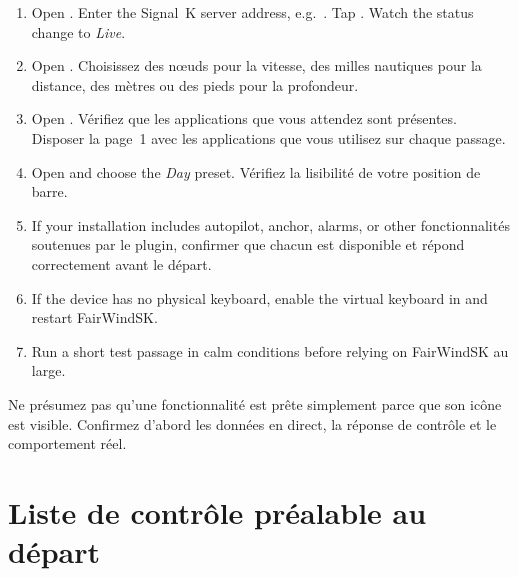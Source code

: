 \begin{enumerate}
  \item Open .
        Enter the Signal~K server address, e.g.\ .
        Tap .
        Watch the status change to \textit{Live}.
  \item Open .
Choisissez des nœuds pour la vitesse, des milles nautiques pour la distance, des mètres ou des pieds pour la profondeur.
  \item Open .
Vérifiez que les applications que vous attendez sont présentes.
Disposer la page~1 avec les applications que vous utilisez sur chaque passage.
  \item Open  and choose the \textit{Day} preset.
Vérifiez la lisibilité de votre position de barre.
  \item If your installation includes autopilot, anchor, alarms, or other
fonctionnalités soutenues par le plugin, confirmer que chacun est disponible et répond correctement
avant le départ.
  \item If the device has no physical keyboard, enable the virtual keyboard in
         and restart FairWindSK.
  \item Run a short test passage in calm conditions before relying on FairWindSK
au large.
\end{enumerate}

\begin{warningbox}
Ne présumez pas qu'une fonctionnalité est prête simplement parce que son icône est visible.
Confirmez d'abord les données en direct, la réponse de contrôle et le comportement réel.
\end{warningbox}

\section{Liste de contrôle préalable au départ}

